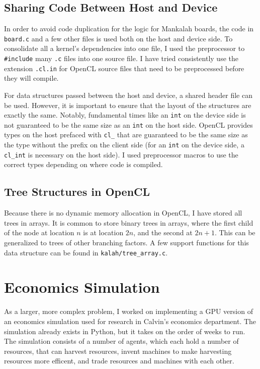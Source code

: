 \documentclass{article}
\begin{document}
\subsection{Sharing Code Between Host and Device}
In order to avoid code duplication for the logic for Mankalah boards, the code in \texttt{board.c} and a few other files is used both on the host and device side. To consolidate all a kernel's dependencies into one file, I used the preprocessor to \texttt{\#include} many \texttt{.c} files into one source file. I have tried consistently use the extension \texttt{.cl.in} for OpenCL source files that need to be preprocessed before they will compile.

For data structures passed between the host and device, a shared header file can be used. However, it is important to ensure that the layout of the structures are exactly the same. Notably, fundamental times like an \texttt{int} on the device side is not guaranteed to be the same size as an \texttt{int} on the host side. OpenCL provides types on the host prefaced with \texttt{cl\_} that are guaranteed to be the same size as the type without the prefix on the client side (for an \texttt{int} on the device side, a \texttt{cl\_int} is necessary on the host side). I used preprocessor macros to use the correct types depending on where code is compiled.

\subsection{Tree Structures in OpenCL}
Because there is no dynamic memory allocation in OpenCL, I have stored all trees in arrays. It is common to store binary trees in arrays, where the first child of the node at location $n$ is at location $2n$, and the second at $2n + 1$. This can be generalized to trees of other branching factors. A few support functions for this data structure can be found in \texttt{kalah/tree_array.c}.

\section{Economics Simulation}
As a larger, more complex problem, I worked on implementing a GPU version of an economics simulation used for research in Calvin's economics department.\cite{ditta13} The simulation already exists in Python, but it takes on the order of weeks to run. The simulation consists of a number of agents, which each hold a number of resources, that can harvest resources, invent machines to make harvesting resources more efficent, and trade resources and machines with each other.
\end{document}
